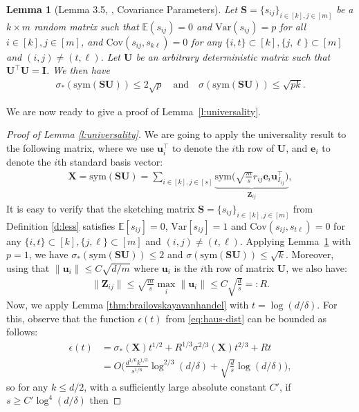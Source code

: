 \documentclass[11pt]{article}
\let\origtop\top
\renewcommand\top{{\scriptscriptstyle{\origtop}}}
\def\e{{\mathbf e}}
\def\u{{\mathbf u}}
\def\I{{\mathbf I}}
\def\S{{\mathbf S}}
\def\X{{\mathbf X}}
\def\Z{{\mathbf Z}}
\def\E{{\mathds E}}
\def\U{{\mathbf U}}
\def\sym{{\mathrm{sym}}}
\def\Var{\mathrm{Var}}
\def\Cov{\mathrm{Cov}}
\newtheorem{lem}[thm]{Lemma}
\begin{document}
  \begin{lem}[Lemma 3.5, \cite{chenakkod2023optimal}, Covariance Parameters]\label{l:cov-parameters}
Let $\S=\{s_{ij}\}_{i \in [k], j \in [m]}$ be a $k \times m$ random
matrix such that $\E(s_{ij})=0$ and $\Var(s_{ij})=p$ for all $i \in
[k], j \in [m]$, and $\Cov(s_{ij},s_{k\ell})=0$ for any $\{i,t\} \subset
[k], \{j,\ell\} \subset [m]$ and $ (i,j)\neq (t,\ell) $.  Let $\U$ be an arbitrary deterministic matrix such that $\U^\top\U = \I$. We then have 
\begin{align*}
\sigma_*(\sym(\S\U)) \leq 2\sqrt{p} 
\quad \text{and} \quad
\sigma(\sym(\S\U)) \leq \sqrt{pk}.
\end{align*}
\end{lem}
We are now ready to give a proof of Lemma~\ref{l:universality}.

\begin{proof}[Proof of Lemma \ref{l:universality}] 
We are going to apply the universality result to the following matrix, where we use $\u_i^\top$ to denote the $i$th row of $\U$, and $\e_i$ to denote the $i$th standard basis vector:
\begin{align*}
  \X = \sym(\S\U) = \sum_{i \in [k], j \in [s]}\underbrace{\sym\Big(\sqrt{\frac ms}r_{ij}\e_{i} \u_{I_{ij}}^\top \Big)}_{\Z_{ij}},
\end{align*}
It is easy to verify that the sketching matrix $\S=\{s_{ij}\}_{i \in [k], j \in [m]}$ from Definition \ref{d:less} satisfies $\E[s_{ij}]=0$, $\Var[s_{ij}] = 1$ and $\Cov(s_{ij},s_{t\ell})=0$ for any $\{i,t\} \subset [k], \{j,\ell\} \subset [m]$ and $ (i,j)\neq (t,\ell) $. 
Applying Lemma~\ref{l:cov-parameters} with $p=1$, we have $\sigma_*(\sym(\S\U))\leq 2$ and $\sigma(\sym(\S\U))\leq\sqrt k$.  Moreover, using that $\|\u_i\|\leq C\sqrt{d/m}$ where $\u_i$ is the $i$th row of matrix $\U$, we also have:
  \begin{align*}
    \|\Z_{ij}\|\leq \sqrt{\frac{m}{s}}\max_{i}\|\u_{i}\|\leq C\sqrt{\frac{d}{s}}=:R.
  \end{align*}
Now, we apply Lemma \ref{thm:brailovskayavanhandel} with $t = \log(d/\delta)$. For this, observe that the function $\epsilon(t)$ from \eqref{eq:haus-dist} can be bounded as follows:
\begin{align*}
\epsilon(t) 
&= \sigma_*(\X)
    t^{1/2}+R^{1/3}\sigma^{2/3}(\X)t^{2/3}+Rt 
    \\
&=
O\bigg(\frac{d^{1/6}k^{1/3}}{s^{1/6}}\log^{2/3}(d/\delta)
+\sqrt{\frac ds}\log(d/\delta)\bigg),
\end{align*}
so for any $k\leq d/2$, with a sufficiently large absolute constant $C'$, if $s\geq C'\log^4(d/\delta)$ then 

\end{proof}
\end{document}
